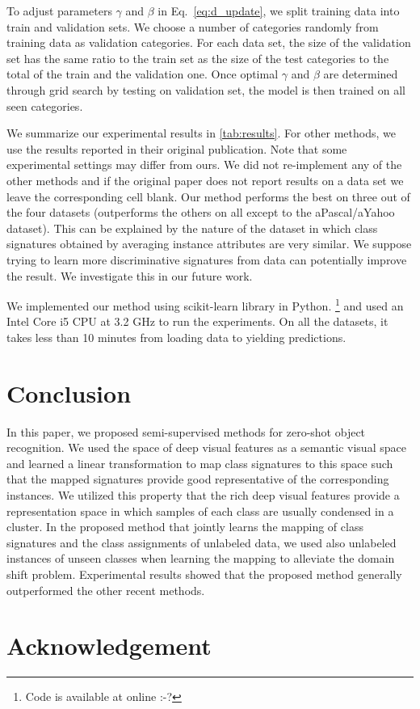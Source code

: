\documentclass[10pt,twocolumn,letterpaper]{article}
\begin{document}
To adjust parameters $\gamma$ and $\beta$ in Eq.~\ref{eq:d_update}, we split training data into train and validation sets.
We choose a number of categories randomly from training data as validation categories. For each data set, the size of the
validation set has the same ratio to the train set as the size of the test categories to the total of the train and the validation one.
Once optimal $\gamma$ and $\beta$ are determined through grid search by testing on validation set, the model
is then trained on all seen categories.

We summarize our experimental results in \ref{tab:results}. For other methods, we use the results reported in their original publication. Note that some experimental settings may differ from ours. We did not re-implement any of the other methods and if the original paper does not report results on a data set we leave the corresponding cell blank.
Our method performs the best on three out of the four datasets (outperforms the others on all except to the aPascal/aYahoo dataset). This can be explained by the nature of the dataset in which class signatures obtained by averaging instance attributes are very similar. We suppose trying to learn
more discriminative signatures from data can potentially improve the result. We investigate this in our future work.

We implemented our method using scikit-learn library \cite{} in Python.
\footnote{Code is available at online :-?}
 and used an Intel Core i5 CPU at 3.2 GHz to run the experiments.
On all the datasets, it takes less than 10 minutes from loading data to yielding predictions.

\section{Conclusion} \label{conclusion}
In this paper, we proposed semi-supervised methods for zero-shot object recognition. We used the space of deep visual features as a semantic visual space and learned a linear transformation to map class signatures to this space such that the mapped signatures provide good representative of the corresponding instances. We utilized this property that the rich deep visual features provide a representation space in which samples of each class are usually condensed in a cluster. In the proposed method that jointly learns the mapping of class signatures and the class assignments of unlabeled data, we used also unlabeled instances of unseen classes when learning the mapping to alleviate the domain shift problem. Experimental results showed that the proposed method generally outperformed the other recent methods. 
\section*{Acknowledgement}
{\small


}
\end{document}
